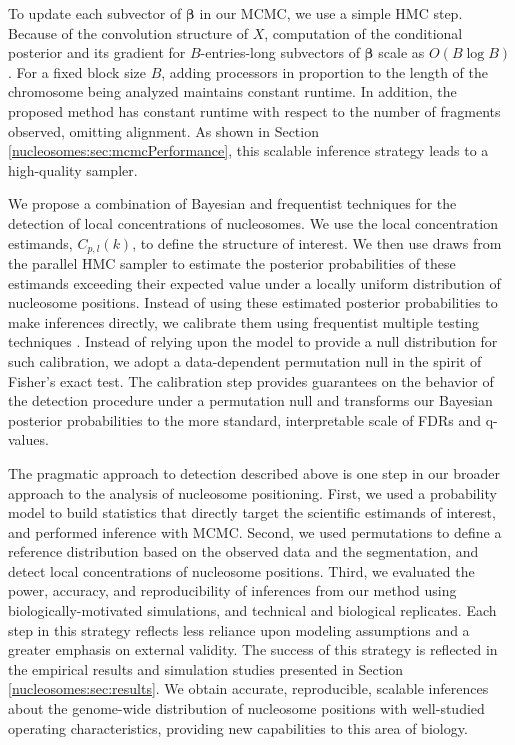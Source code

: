 To update each subvector of $\bm \beta$ in our MCMC, we use a simple HMC step.
Because of the convolution structure of $X$, computation of the conditional posterior and its gradient for $B$-entries-long subvectors of $\bm \beta$ scale as $O(B \log B)$. 
For a fixed block size $B$, adding processors in proportion to the length of the chromosome being analyzed maintains constant runtime.
In addition, the proposed method has constant runtime with respect to the number of fragments observed, omitting alignment.
As shown in Section \ref{nucleosomes:sec:mcmcPerformance}, this scalable inference strategy leads to a high-quality sampler.


We propose a combination of Bayesian and frequentist techniques for the detection of local concentrations of nucleosomes.
We use the local concentration estimands, $C_{p,l}(k)$, to define the structure of interest.
We then use draws from the parallel HMC sampler to estimate the posterior probabilities of these estimands exceeding their expected value under a locally uniform distribution of nucleosome positions.
%
Instead of using these estimated posterior probabilities to make inferences directly, we calibrate them using frequentist multiple testing techniques \citep{StoreyTibshirani2003}.
Instead of relying upon the model to provide a null distribution for such calibration, we adopt a data-dependent permutation null in the spirit of Fisher's exact test.
%
The calibration step provides guarantees on the behavior of the detection procedure under a permutation null and transforms our Bayesian posterior probabilities to the more standard, interpretable scale of FDRs and q-values.

The pragmatic approach to detection described above is one step in our broader approach to the analysis of nucleosome positioning.
%
First, we used a probability model to build statistics that directly target the scientific estimands of interest, and performed inference with MCMC.
Second, we used permutations to define a reference distribution based on the observed data and the segmentation, and detect local concentrations of nucleosome positions.
Third, we evaluated the power, accuracy, and reproducibility of inferences from our method using biologically-motivated simulations, and technical and biological replicates.
Each step in this strategy reflects less reliance upon modeling assumptions and a greater emphasis on external validity.
%
The success of this strategy is reflected in the empirical results and simulation studies presented in Section \ref{nucleosomes:sec:results}.
We obtain accurate, reproducible, scalable inferences about the genome-wide distribution of nucleosome positions with well-studied operating characteristics, providing new capabilities to this area of biology.

